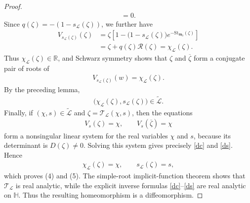 \documentclass[11pt]{amsart}
\theoremstyle{plain}
\newcommand\RR{{\mathbb R}}
\newcommand\bm{\mathbf{m}}
\numberwithin{equation}{section}
\numberwithin{theorem}{section}
\numberwithin{figure}{section}
\begin{document}
\begin{proof}
\begin{align*}
    =0.
\end{align*}
Since $q(\zeta)=-(1-s_{\mathcal L}(\zeta))$, we further have
\begin{align*}
    V_{s_{\mathcal L}(\zeta)}(\zeta)
    &=
    \zeta\left[
        1-
        \bigl(1-s_{\mathcal L}(\zeta)\bigr)
        e^{-\mathrm{St}_{\bm_0}(\zeta)}
    \right]\\
    &=
    \zeta+q(\zeta)\mathscr R(\zeta)
    =
    \chi_{\mathcal L}(\zeta).
\end{align*}
Thus $\chi_{\mathcal L}(\zeta)\in\RR$, and Schwarz symmetry shows
that $\zeta$ and $\overline\zeta$ form a conjugate pair of roots of
\begin{align*}
    V_{s_{\mathcal L}(\zeta)}(w)
    =
    \chi_{\mathcal L}(\zeta).
\end{align*}
By the preceding lemma,
\begin{align*}
    \bigl(
        \chi_{\mathcal L}(\zeta),
        s_{\mathcal L}(\zeta)
    \bigr)
    \in\widetilde{\mathcal L}.
\end{align*}
Finally, if $(\chi,s)\in\widetilde{\mathcal L}$ and
$\zeta=\mathcal T_{\mathcal L}(\chi,s)$, then the equations
\begin{align*}
    V_s(\zeta)=\chi,
    \qquad
    V_s(\overline\zeta)=\chi
\end{align*}
form a nonsingular linear system for the real variables $\chi$ and
$s$, because its determinant is $D(\zeta)\neq0$. Solving this system
gives precisely \eqref{dc} and \eqref{ds}. Hence
\begin{align*}
    \chi_{\mathcal L}(\zeta)=\chi,
    \qquad
    s_{\mathcal L}(\zeta)=s,
\end{align*}
which proves (4) and (5). The simple-root implicit-function theorem
shows that $\mathcal T_{\mathcal L}$ is real analytic, while the explicit inverse
formulas \eqref{dc}--\eqref{ds} are real analytic on $\mathbb H$.
Thus the resulting homeomorphism is a diffeomorphism.


\end{proof}
\end{document}
